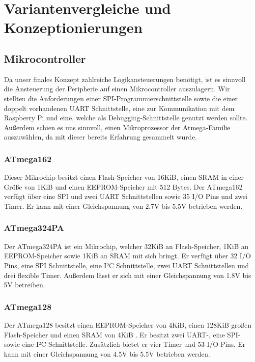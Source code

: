 \section{Variantenvergleiche und Konzeptionierungen}

\subsection{Mikrocontroller}
Da unser finales Konzept zahlreiche Logikansteuerungen benötigt, ist es sinnvoll die Ansteuerung der Peripherie auf einen Mikrocontroller auszulagern.
Wir stellten die Anforderungen einer \acs{SPI}-Programmierschnittstelle sowie die einer doppelt vorhandenen UART Schnittstelle, eine zur Kommunikation mit dem Raspberry Pi und eine, welche als Debugging-Schnittstelle genutzt werden sollte.
Außerdem schien es uns sinnvoll, einen Mikroprozessor der Atmega-Familie auszuwählen, da mit dieser bereits Erfahrung gesammelt wurde.

\subsubsection{ATmega162}
Dieser Mikrochip besitzt einen Flash-Speicher von 16KiB, einen \acs{SRAM} in einer Größe von 1KiB und einen \acs{EEPROM}-Speicher mit 512 Bytes.
Der ATmega162 verfügt über eine SPI und zwei UART Schnittstellen sowie 35 \acs{I/O} Pins und zwei Timer.
Er kann mit einer Gleichspannung von 2.7V bis 5.5V betrieben werden.

\subsubsection{ATmega324PA}
\footnotemark[1]Der ATmega324PA ist ein Mikrochip, welcher 32KiB an Flash-Speicher, 1KiB an EEPROM-Speicher sowie 1KiB an SRAM mit sich bringt.
Er verfügt über 32 I/O Pins, eine SPI Schnittstelle, eine I²C Schnittstelle, zwei UART Schnittstellen und drei flexible Timer.
Außerdem lässt er sich mit einer Gleichspannung von 1.8V bis 5V betreiben.

\subsubsection{ATmega128}
\footnotemark[1]Der ATmega128 besitzt einen EEPROM-Speicher von 4KiB, einen 128KiB großen Flash-Speicher und einen SRAM von 4KiB .
Er besitzt zwei UART-, eine SPI- sowie eine I²C-Schnittstelle.
Zusätzlich bietet er vier Timer und 53 I/O Pins.
Er kann mit einer Gleichspannung von 4.5V bis 5.5V betrieben werden.

